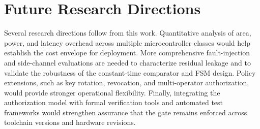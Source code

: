 \section{Future Research Directions}
Several research directions follow from this work. Quantitative analysis of area, power, and
latency overhead across multiple microcontroller classes would help establish the cost envelope
for deployment. More comprehensive fault-injection and side-channel evaluations are needed to
characterize residual leakage and to validate the robustness of the constant-time comparator and
FSM design. Policy extensions, such as key rotation, revocation, and multi-operator authorization,
would provide stronger operational flexibility. Finally, integrating the authorization model with
formal verification tools and automated test frameworks would strengthen assurance that the gate
remains enforced across toolchain versions and hardware revisions.
